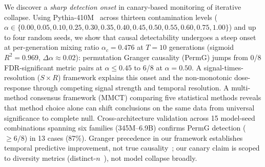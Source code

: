 We discover a \emph{sharp detection onset} in canary-based monitoring of iterative collapse.
Using Pythia-410M~\cite{biderman2023pythia} across thirteen contamination levels ($\alpha \in \{0.00, 0.05, 0.10, 0.25, 0.30, 0.35, 0.40, 0.45, 0.50, 0.55, 0.60, 0.75, 1.00\}$) and up to four random seeds, we show that causal detectability undergoes a steep onset at per-generation mixing ratio $\alpha_c{=}0.476$ at $T{=}10$ generations (sigmoid $R^2{=}0.969$, $\Delta\alpha{\approx}0.02$): permutation Granger causality (PermG) jumps from 0/8 FDR-significant metric pairs at $\alpha{\leq}0.45$ to 6/8 at $\alpha{=}0.50$.
A signal-times-resolution ($S \times R$) framework explains this onset and the non-monotonic dose-response through competing signal strength and temporal resolution.
A multi-method consensus framework (MMCT) comparing five statistical methods reveals that method choice alone can shift conclusions on the same data from universal significance to complete null.
Cross-architecture validation across 15 model-seed combinations spanning six families (345M--6.9B) confirms PermG detection (${\geq}6/8$) in 13 cases (87\%).
Granger precedence in our framework establishes temporal predictive improvement, not true causality~\cite{shojaie2022granger}; our canary claim is scoped to diversity metrics (distinct-$n$~\cite{li2016diversity}), not model collapse broadly.


